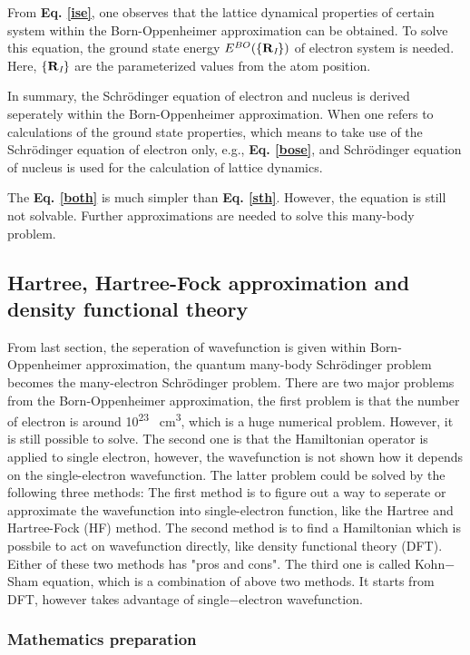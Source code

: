 \documentclass[a4paper, 12pt, titlepage,oneside,drop]{kthesis}
\begin{document}
From \textbf{Eq. \ref{ise}}, one observes that the lattice dynamical properties of certain system within the Born-Oppenheimer approximation can be obtained. To solve this equation,
the ground state energy $E^{BO}(\{{{\textbf R}_{\textit I}}\})$ of electron system is needed. Here, $\{{\textbf R}_{\textit I}\}$ are the parameterized values from the atom position.
 
In summary, the Schrödinger equation of electron and nucleus is derived seperately within the Born-Oppenheimer approximation. When one refers to calculations of the ground state properties,
which means to take use of the Schrödinger equation of electron only, e.g., \textbf{Eq. \ref{bose}}, and Schrödinger equation of nucleus is used for the calculation of lattice dynamics.

The \textbf{Eq. \ref{both}} is much simpler than \textbf{Eq. \ref{sth}}. However, the equation is still not solvable. Further approximations  are needed
to solve this many-body problem.

\subsection{Hartree, Hartree-Fock approximation and density functional theory}

From last section, the seperation of wavefunction is given within Born-Oppenheimer approximation, the quantum many-body Schrödinger problem becomes the many-electron 
Schrödinger problem. There are two major problems from the Born-Oppenheimer approximation, the first problem is that the number of electron is around 10\textsuperscript{23} \si{\per\cubic\centi\metre}, which is a huge numerical problem.
However, it is still possible to solve.
The second one is that the Hamiltonian operator is applied to single electron, however, the wavefunction is not shown how it depends on the single-electron wavefunction. The latter problem 
could be solved by the following three methods: The first method is to figure out a way to seperate or approximate the wavefunction into single-electron function, like the Hartree and Hartree-Fock (HF) method. The second method is to
find a Hamiltonian which is possbile to act on wavefunction directly, like density functional theory (DFT). Either of these two methods has "pros and cons". The third one is called Kohn$-$Sham equation,
which is a combination of above two methods. It starts from DFT, however takes advantage of single$-$electron wavefunction. 

\subsubsection{Mathematics preparation}
\end{document}
